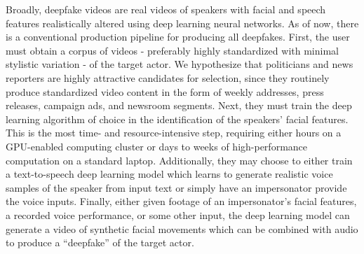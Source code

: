 Broadly, deepfake videos are real videos of speakers with facial and
speech features realistically altered using deep learning neural
networks. As of now, there is a conventional production pipeline for
producing all deepfakes. First, the user must obtain a corpus of
videos - preferably highly standardized with minimal stylistic
variation - of the target actor. We hypothesize that politicians and
news reporters are highly attractive candidates for selection, since
they routinely produce standardized video content in the form of
weekly addresses, press releases, campaign ads, and newsroom
segments. Next, they must train the deep learning algorithm of choice
in the identification of the speakers’ facial features. This is the
most time- and resource-intensive step, requiring either hours on a
GPU-enabled computing cluster or days to weeks of high-performance
computation on a standard laptop. Additionally, they may choose to
either train a text-to-speech deep learning model which learns to
generate realistic voice samples of the speaker from input text or
simply have an impersonator provide the voice inputs. Finally, either
given footage of an impersonator’s facial features, a recorded voice
performance, or some other input, the deep learning model can generate
a video of synthetic facial movements which can be combined with audio
to produce a “deepfake” of the target actor.

